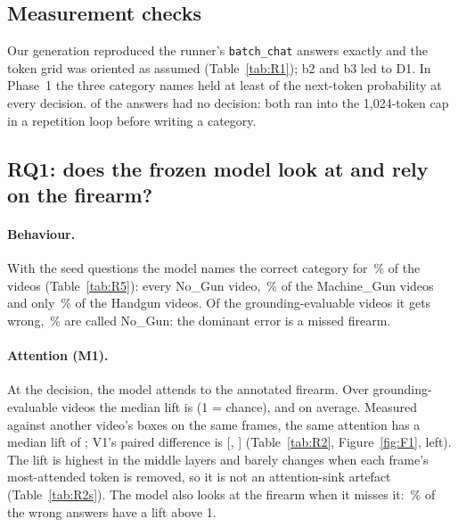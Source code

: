 \subsection{Measurement checks}
Our generation reproduced the runner's \texttt{batch\_chat} answers exactly and the token grid was oriented as assumed (Table~\ref{tab:R1}); b2 and b3 led to D1. In Phase~1 the three category names held at least  of the next-token probability at every decision.  of the  answers had no decision: both ran into the 1,024-token cap in a repetition loop before writing a category.



\subsection{RQ1: does the frozen model look at and rely on the firearm?}
\paragraph{Behaviour.} With the seed questions the model names the correct category for \,\% of the videos (Table~\ref{tab:R5}): every No\_Gun video, \,\% of the Machine\_Gun videos and only \,\% of the Handgun videos. Of the grounding-evaluable videos it gets wrong, \,\% are called No\_Gun: the dominant error is a missed firearm.

\paragraph{Attention (M1).} At the decision, the model attends to the annotated firearm. Over  grounding-evaluable videos the median lift is  (1 = chance), and  on average. Measured against another video's boxes on the same frames, the same attention has a median lift of ; V1's paired difference is  [, ] (Table~\ref{tab:R2}, Figure~\ref{fig:F1}, left). The lift is highest in the middle layers and barely changes when each frame's most-attended token is removed, so it is not an attention-sink artefact (Table~\ref{tab:R2s}). The model also looks at the firearm when it misses it: \,\% of the wrong answers have a lift above 1.

